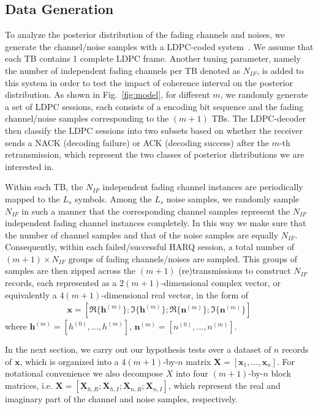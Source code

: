 \documentclass[journal,draftcls,onecolumn,12pt,twoside]{IEEEtran}
\begin{document}
\subsection{Data Generation}
To analyze the posterior distribution of the fading channels and
noises, we generate the channel/noise samples with a LDPC-coded
system~\cite{hochwald2003achieving}\cite{valenti2007coded}. We assume that each
TB contains 1 complete LDPC frame. Another tuning parameter, namely the number of independent fading channels per TB denoted as $N_{IF}$, is added
to this system in order to test the impact of coherence interval on the
posterior distribution. As shown in Fig.~\ref{fig:model}, for different $m$, we
randomly generate a set of LDPC sessions, each consists of a encoding bit sequence and the
fading channel/noise samples corresponding to the $(m+1)$ TBs. The LDPC-decoder
then classify the LDPC sessions into two subsets based on whether the receiver
sends a NACK (decoding failure) or ACK (decoding success) after the $m$-th
retransmission, which represent the two classes of posterior distributions we
are interested in.

Within each TB, the $N_{IF}$ independent fading
channel instances are periodically mapped to the $L_s$ symbols. Among the $L_s$
noise samples, we randomly sample $N_{IF}$ in such a manner that the
corresponding channel samples represent the $N_{IF}$ independent fading
channel instances completely. In this way we make sure that the number of
channel samples and that of the noise samples are equally $N_{IF}$.
Consequently, within each failed/successful HARQ session, a total number of
$(m+1)\times N_{IF}$ groups of fading channels/noises are sampled. This groups of samples are then zipped across the
$(m+1)$ (re)transmissions to construct $N_{IF}$ records, each represented as a
$2(m+1)$-dimensional complex vector, or equivalently a $4(m+1)$-dimensional
real vector, in the form of
\begin{align}
  \mathbf{x} = \left[\Re\{\mathbf{h}^{(m)}\}; \Im\{\mathbf{h}^{(m)}\}; 
  \Re\{\mathbf{n}^{(m)}\}; \Im\{\mathbf{n}^{(m)}\}\right]
\end{align} 
where $\mathbf{h}^{(m)} = [h^{(0)},\ldots,h^{(m)}]$, $\mathbf{n}^{(m)} =
[n^{(0)},\ldots,n^{(m)}]$.

In the next section, we carry out our hypothesis
tests over a dataset of $n$ records of $\mathbf{x}$, which is organized into a $4(m+1)$-by-$n$ matrix
$\mathbf{X} = [\mathbf{x}_1, \ldots, \mathbf{x}_n]$. For notational convenience
we also decompose $X$ into four $(m+1)$-by-$n$ block matrices, i.e.
$\mathbf{X} = [\mathbf{X}_{h,R}; \mathbf{X}_{h,I}; \mathbf{X}_{n, R};
\mathbf{X}_{n, I}]$, which represent the real and imaginary part of the channel
and noise samples, respectively.
\end{document}
